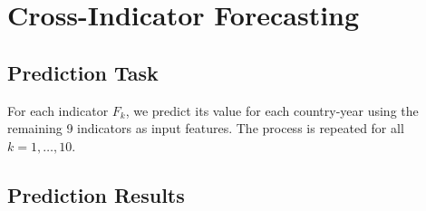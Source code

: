 \documentclass[12pt]{article}
\begin{document}
\section{Cross-Indicator Forecasting}

\subsection{Prediction Task}
For each indicator $F_k$, we predict its value for each country-year using the remaining 9 indicators as input features. The process is repeated for all $k = 1, \ldots, 10$.
\subsection{Prediction Results}
\end{document}
